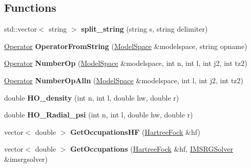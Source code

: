 \subsection*{Functions}
\begin{DoxyCompactItemize}
\item 
\mbox{\label{namespaceimsrg__util_add047e0dbcc85ad8b471e95bcb6abf72}} 
std\+::vector$<$ string $>$ {\bfseries split\+\_\+string} (string s, string delimiter)
\item 
\mbox{\label{namespaceimsrg__util_ab1a2cdf32c06d7f8c6672a668021ef6a}} 
\hyperlink{classOperator}{Operator} {\bfseries Operator\+From\+String} (\hyperlink{classModelSpace}{Model\+Space} \&modelspace, string opname)
\item 
\mbox{\label{namespaceimsrg__util_a23e781fc64db8aa28b00ccb08d5246f0}} 
\hyperlink{classOperator}{Operator} {\bfseries Number\+Op} (\hyperlink{classModelSpace}{Model\+Space} \&modelspace, int n, int l, int j2, int tz2)
\item 
\mbox{\label{namespaceimsrg__util_a5eff649a6b88bf4324db34d84d2750d4}} 
\hyperlink{classOperator}{Operator} {\bfseries Number\+Op\+Alln} (\hyperlink{classModelSpace}{Model\+Space} \&modelspace, int l, int j2, int tz2)
\item 
\mbox{\label{namespaceimsrg__util_a32d3de8aa26f56a0ffbc68733e42b510}} 
double {\bfseries H\+O\+\_\+density} (int n, int l, double hw, double r)
\item 
\mbox{\label{namespaceimsrg__util_a5370d789ca7843ff9fa85bb14832e5bb}} 
double {\bfseries H\+O\+\_\+\+Radial\+\_\+psi} (int n, int l, double hw, double r)
\item 
\mbox{\label{namespaceimsrg__util_aba868a31cfcd7baf072b092bb7537151}} 
vector$<$ double $>$ {\bfseries Get\+Occupations\+HF} (\hyperlink{classHartreeFock}{Hartree\+Fock} \&hf)
\item 
\mbox{\label{namespaceimsrg__util_aaa2f5ceb4f1c996407d06bd470865297}} 
vector$<$ double $>$ {\bfseries Get\+Occupations} (\hyperlink{classHartreeFock}{Hartree\+Fock} \&hf, \hyperlink{classIMSRGSolver}{I\+M\+S\+R\+G\+Solver} \&imsrgsolver)

\end{DoxyCompactItemize}
